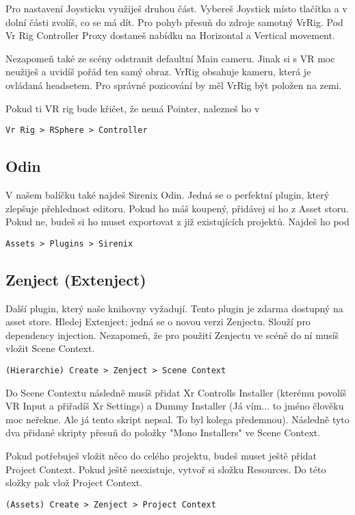 \documentclass{article}
\begin{document}
Pro nastavení Joysticku využiješ druhou část. Vybereš Joystick místo tlačítka a v dolní části zvolíš, co se má dít. Pro pohyb přesuň do zdroje samotný VrRig. Pod Vr Rig Controller Proxy dostaneš nabídku na Horizontal a Vertical movement.

Nezapomeň také ze scény odstranit defaultní Main cameru. Jinak si s VR moc neužiješ a uvidíš pořád ten samý obraz. VrRig obsahuje kameru, která je ovládaná headsetem. Pro správné pozicování by měl VrRig být položen na zemi.

Pokud ti VR rig bude křičet, že nemá Pointer, nalezneš ho v
\begin{lstlisting}
Vr Rig > RSphere > Controller
\end{lstlisting}

\subsection{Odin}
V našem balíčku také najdeš Sirenix Odin. Jedná se o perfektní plugin, který zlepšuje přehlednost editoru. Pokud ho máš koupený, přidávej si ho z Asset storu. Pokud ne, budeš si ho muset exportovat z již existujících projektů. Najdeš ho pod
\begin{lstlisting}
Assets > Plugins > Sirenix
\end{lstlisting}

\subsection{Zenject (Extenject)}
Další plugin, který naše knihovny vyžadují. Tento plugin je zdarma dostupný na asset store. Hledej Extenject; jedná se o novou verzi Zenjectu. Slouží pro dependency injection.
Nezapomeň, že pro použití Zenjectu ve scéně do ní musíš vložit Scene Context.
\begin{lstlisting}
(Hierarchie) Create > Zenject > Scene Context
\end{lstlisting}
Do Scene Contextu následně musíš přidat Xr Controlls Installer (kterému povolíš VR Input a přiřadíš Xr Settings) a Dummy Installer (Já vím... to jméno člověku moc neřekne. Ale já tento skript nepsal. To byl kolega předemnou). Následně tyto dva přidané skripty přesuň do položky "Mono Installers" ve Scene Context.

Pokud potřebuješ vložit něco do celého projektu, budeš muset ještě přidat Project Context. Pokud ještě neexistuje, vytvoř si složku Resources. Do této složky pak vlož Project Context.
\begin{lstlisting}
(Assets) Create > Zenject > Project Context
\end{lstlisting}
\end{document}
